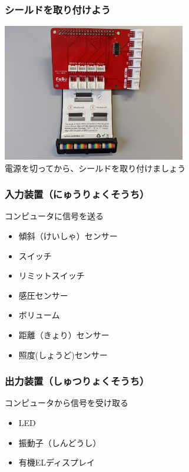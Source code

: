 \begin{frame}
    \frametitle{シールドを取り付けよう}
    \begin{center}
        \includegraphics[width=0.6\textwidth]{images/chap05/fabo_and_cable.jpg}
        {\\\color{red}電源を切ってから\color{black}、シールドを取り付けましょう}
    \end{center}
\end{frame}

\begin{frame}
    \frametitle{入力装置（にゅうりょくそうち）} 
    \begin{center}
        {コンピュータに信号を送る}
        \begin{itemize}
            \item 傾斜（けいしゃ）センサー
            \item スイッチ
            \item リミットスイッチ
            \item 感圧センサー
            \item ボリューム
            \item 距離（きょり）センサー
            \item 照度(しょうど)センサー 
        \end{itemize}
    \end{center}
\end{frame}

\begin{frame}
    \frametitle{出力装置（しゅつりょくそうち）} 
    \begin{center}
        {コンピュータから信号を受け取る}
        \begin{itemize}
            \item LED
            \item 振動子（しんどうし）
            \item 有機ELディスプレイ
        \end{itemize}
    \end{center}
\end{frame}

